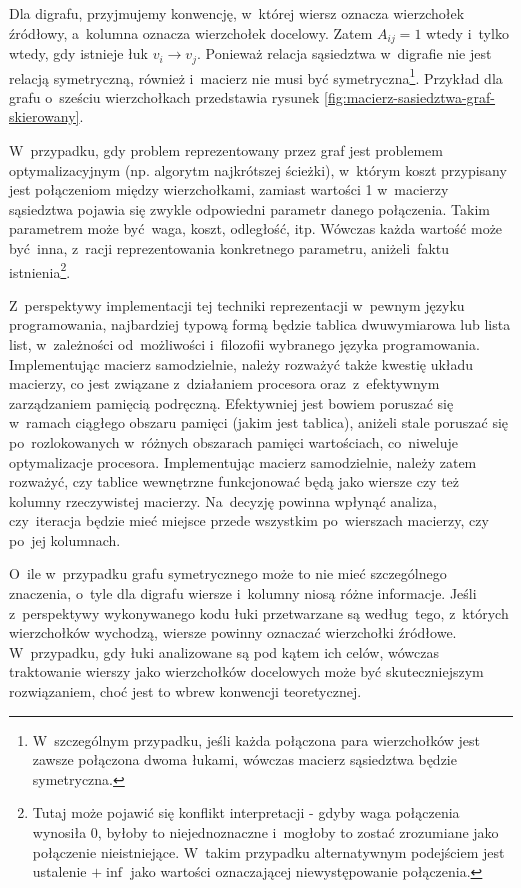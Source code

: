 \documentclass[11pt,a4paper,oneside]{report}
\begin{document}


Dla digrafu, przyjmujemy konwencję, w~której wiersz oznacza wierzchołek źródłowy, a~kolumna oznacza wierzchołek docelowy. Zatem $A_{ij}=1$ wtedy i~tylko wtedy, gdy istnieje łuk $v_i \to v_j$. Ponieważ relacja sąsiedztwa w~digrafie nie jest relacją symetryczną, również i~macierz nie musi być symetryczna\footnote{W~szczególnym przypadku, jeśli każda połączona para wierzchołków jest zawsze połączona dwoma łukami, wówczas macierz sąsiedztwa będzie symetryczna.}. Przykład dla grafu o~sześciu wierzchołkach przedstawia rysunek \ref{fig:macierz-sasiedztwa-graf-skierowany}.



W~przypadku, gdy problem reprezentowany przez graf jest problemem optymalizacyjnym (np. algorytm najkrótszej ścieżki), w~którym koszt przypisany jest połączeniom między wierzchołkami, zamiast wartości 1 w~macierzy sąsiedztwa pojawia się zwykle odpowiedni parametr danego połączenia. Takim parametrem może być waga, koszt, odległość, itp. Wówczas każda wartość może być inna, z~racji reprezentowania konkretnego parametru, aniżeli~faktu istnienia\footnote{Tutaj może pojawić się konflikt interpretacji - gdyby waga połączenia wynosiła 0, byłoby to niejednoznaczne i~mogłoby to zostać zrozumiane jako połączenie nieistniejące. W~takim przypadku alternatywnym podejściem jest ustalenie $+\inf$ jako wartości oznaczającej niewystępowanie połączenia.}.

Z~perspektywy implementacji tej techniki reprezentacji w~pewnym języku programowania, najbardziej typową formą będzie tablica dwuwymiarowa lub lista list, w~zależności od~możliwości i~filozofii wybranego języka programowania. Implementując macierz samodzielnie, należy rozważyć także kwestię układu macierzy, co jest związane z~działaniem procesora oraz~z~efektywnym zarządzaniem pamięcią podręczną. Efektywniej jest bowiem poruszać się w~ramach ciągłego obszaru pamięci (jakim jest tablica), aniżeli stale poruszać się po~rozlokowanych w~różnych obszarach pamięci wartościach, co~niweluje optymalizacje procesora. Implementując macierz samodzielnie, należy zatem rozważyć, czy tablice wewnętrzne funkcjonować będą jako wiersze czy też kolumny rzeczywistej macierzy. Na~decyzję powinna wpłynąć analiza, czy~iteracja będzie mieć miejsce przede wszystkim po~wierszach macierzy, czy po~jej kolumnach.

O~ile w~przypadku grafu symetrycznego może to nie mieć szczególnego znaczenia, o~tyle dla digrafu wiersze i~kolumny niosą różne informacje. Jeśli z~perspektywy wykonywanego kodu łuki przetwarzane są według~tego, z~których wierzchołków wychodzą, wiersze powinny oznaczać wierzchołki źródłowe. W~przypadku, gdy łuki analizowane są pod kątem ich celów, wówczas traktowanie wierszy jako wierzchołków docelowych może być skuteczniejszym rozwiązaniem, choć jest to wbrew konwencji teoretycznej.
\end{document}
